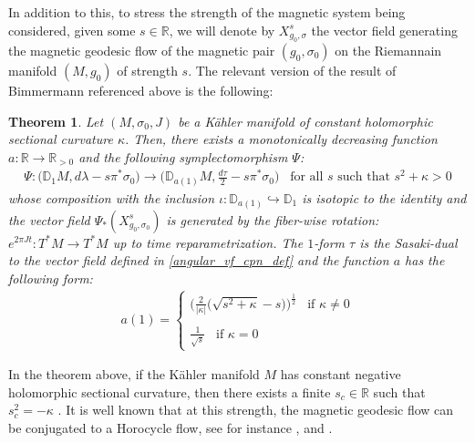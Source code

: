 \documentclass[11pt]{amsart}
\theoremstyle{plain}
\newtheorem{theorem}{Theorem}[section]
\theoremstyle{definition}
\theoremstyle{remark}
\begin{document}
In addition to this, to stress the strength of the magnetic system being considered, given some $s \in \mathbb{R}$, we will denote by $X^{s}_{g_0,\sigma} $ the vector field generating the magnetic geodesic flow of the magnetic pair $(g_0,\sigma_0)$ on the Riemannain manifold $(M,g_0)$ of strength $s$. The relevant version of the result of Bimmermann referenced above is the following:
\begin{theorem}\cite[Theorem A \& Theorem B]{johanna_negative_curvature}\label{zollness_of_mag_systems_kahler}
    Let $(M,\sigma_0, J)$ be a K\"ahler manifold of constant holomorphic sectional curvature $\kappa$. Then, there exists a monotonically decreasing function $a:\mathbb{R} \rightarrow \mathbb{R}_{>0}$ and the following symplectomorphism $\Psi$: 
\begin{align}\label{Bimmermann_symplectomorphism}
        \Psi: \bigg(\mathbb{D}_{1}M, d\lambda-s\pi^*\sigma_0\bigg) \rightarrow \bigg(\mathbb{D}_{ a(1)}M, \frac{d\tau}{2} -s\pi^*\sigma_0\bigg) \;\;\; \text{for all $s$ such that $s^2+ \kappa >0$}
    \end{align}
    whose composition with the inclusion $\iota: \mathbb{D}_{a(1)} \hookrightarrow \mathbb{D}_{1}$ is isotopic to the identity and the vector field $\Psi_*(X^{s}_{g_0,\sigma_0})$ is generated by the fiber-wise rotation: \\$e^{2\pi Jt}: T^*M \rightarrow T^*M$ up to time reparametrization. The $1$-form $\tau$ is the Sasaki-dual to the vector field defined in \eqref{angular_vf_cpn_def} and the function $a$ has the following form:
\begin{align}\label{def_of_a_mag_zoll}
        a(1) = \begin{cases}
            \bigg(\frac{2}{\vert\kappa\vert} \big(\sqrt{s^2+\kappa}-s \big)  \bigg)^{\frac{1}{2}}\;\;\; \text{if $\kappa \neq 0$} \\
            \\
            \frac{1}{\sqrt{s}} \;\;\; \text{if $\kappa =0$}
            \end{cases}
    \end{align}
\end{theorem}
In the theorem above, if the K\"ahler manifold $M$ has constant negative holomorphic sectional curvature, then there exists a finite $s_c \in \mathbb{R}$ such that $s_c^2= -\kappa$ \cite{johanna_negative_curvature}. It is well known that at this strength, the magnetic geodesic flow can be conjugated to a Horocycle flow, see for instance \cite{johanna_negative_curvature}, \cite{CieliebakFrauenfelderPaternain2010} and \cite{paternain_horocycle}.\\
\end{document}
